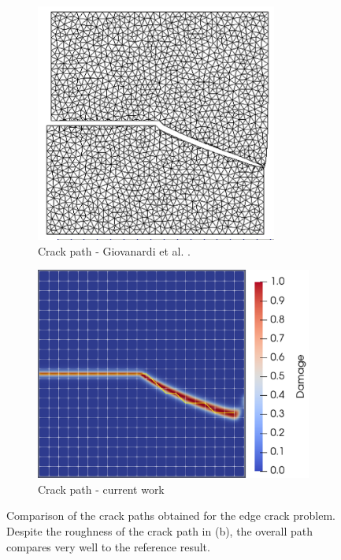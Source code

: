 \begin{figure}[h]
    \begin{subfigure}{.45\textwidth}
      \centering
      \includegraphics[width=0.765\linewidth]{Chapter4/figures/nonplanar/curved_crack_result_bianca.png}
      \caption{Crack path - Giovanardi et al. \cite{giovanardi2017hybrid}.}
      \label{fig:reference result}
    \end{subfigure}%
    \begin{subfigure}{.54\textwidth}
      \centering
      \includegraphics[width=0.83\linewidth]{Chapter4/figures/nonplanar/nonplanar_example.png}
      \caption{Crack path - current work}
      \label{fig:crack_path}
    \end{subfigure}%
      \caption{Comparison of the crack paths obtained for the edge crack problem. Despite the roughness of the crack path in (b), the overall path compares very well to the reference result.} 
      \label{fig:nonplanar_example}
\end{figure}